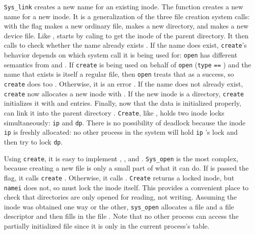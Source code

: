 \lstinline{Sys_link}
creates a new name for an existing inode.
The function
creates a new name for a new inode.
It is a generalization of the three file creation
system calls:
with the
flag makes a new ordinary file,
makes a new directory,
and
makes a new device file.
Like
,
starts by caling
to get the inode of the parent directory.
It then calls
to check whether the name already exists
.
If the name does exist, 
\lstinline{create}'s
behavior depends on which system call it is being used for:
\lstinline{open}
has different semantics from 
and
.
If
\lstinline{create}
is being used on behalf of
\lstinline{open}
(\lstinline{type}
\lstinline{==}
)
and the name that exists is itself
a regular file,
then 
\lstinline{open}
treats that as a success,
so
\lstinline{create}
does too
.
Otherwise, it is an error
.
If the name does not already exist,
\lstinline{create}
now allocates a new inode with
.
If the new inode is a directory, 
\lstinline{create}
initializes it with
and
entries.
Finally, now that the data is initialized properly,
can link it into the parent directory
.
\lstinline{Create},
like
,
holds two inode locks simultaneously:
\lstinline{ip}
and
\lstinline{dp}.
There is no possibility of deadlock because
the inode
\lstinline{ip}
is freshly allocated: no other process in the system
will hold 
\lstinline{ip} 's
lock and then try to lock
\lstinline{dp}.

Using
\lstinline{create},
it is easy to implement
,
,
and
.
\lstinline{Sys_open}
is the most complex, because creating a new file is only
a small part of what it can do.
If
is passed the
flag, it calls
\lstinline{create}
.
Otherwise, it calls
.
\lstinline{Create}
returns a locked inode, but 
\lstinline{namei}
does not, so
must lock the inode itself.
This provides a convenient place to check that directories
are only opened for reading, not writing.
Assuming the inode was obtained one way or the other,
\lstinline{sys_open}
allocates a file and a file descriptor
and then fills in the file
.
Note that no other process can access the partially initialized file since it is only
in the current process's table.


